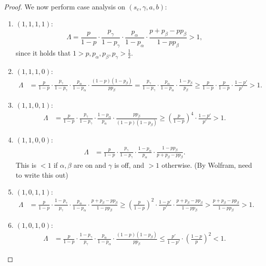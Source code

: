 \begin{proof}
    We now perform case analysis on $ \left( s_c, \gamma, a, b \right) $:
    \begin{enumerate}[ ]
        \item $ \left( 1,1,1,1 \right) $: \[
            \Lambda = \frac{p}{1-p} \cdot \frac{p_\gamma}{1-p_\gamma} \cdot \frac{p_\alpha}{1-p_\alpha} \cdot \frac{p+p_\beta - pp_\beta}{1-pp_\beta} > 1,
        \]
        since it holds that $ 1>p,p_\alpha, p_\beta, p_\gamma> \frac 12  $.
        \item $ \left( 1,1,1,0 \right) $: \begin{align*}
                \Lambda &= \frac{p}{1-p} \cdot \frac{p_\gamma}{1-p_\gamma} \cdot \frac{p_\alpha}{1-p_\alpha} \cdot \frac{\left( 1-p \right)\left( 1-p_\beta \right)}{pp_\beta} = \frac{p_\gamma}{1-p_\gamma} \cdot \frac{p_\alpha}{1-p_\alpha} \cdot \frac{1-p_\beta}{p_\beta} \geq \frac{p}{1-p} \cdot \frac{p}{1-p}  \cdot \frac{1-p'}{p'} > 1.
        \end{align*}
        \item $ \left( 1,1,0,1 \right) $: \begin{align*}
                \Lambda &= \frac{p}{1-p} \cdot \frac{p_\gamma}{1-p_\gamma} \cdot \frac{1-p_\alpha}{p_\alpha} \cdot \frac{pp_\beta}{\left( 1-p \right)\left( 1-p_\beta \right)} \geq \left( \frac{p}{1-p} \right)^4 \cdot \frac{1-p'}{p'} > 1.
        \end{align*}
        \item $ \left( 1,1,0,0 \right) $: \begin{align*}
                \Lambda &= \frac{p}{1-p} \cdot \frac{p_\gamma}{1-p_\gamma} \cdot \frac{1-p_\alpha}{p_\alpha} \cdot \frac{1-pp_\beta}{p+p_\beta - pp_\beta}.
        \end{align*}
        This is $ <1 $ if $ \alpha, \beta  $ are on and $ \gamma $ is off, and $ >1 $ otherwise. (By Wolfram, need to write this out)
        \item $ \left( 1,0,1,1 \right) $: \begin{align*}
                \Lambda &= \frac{p}{1-p} \cdot \frac{1-p_\gamma}{p_\gamma} \cdot \frac{p_\alpha}{1-p_\alpha} \cdot \frac{p+p_\beta - pp_\beta}{1-pp_\beta} \geq \left( \frac{p}{1-p} \right)^2 \cdot \frac{1-p'}{p'} \cdot \frac{p+p_\beta - pp_\beta}{1-pp_\beta} > \frac{p+p_\beta - pp_\beta}{1-pp_\beta} > 1.
        \end{align*}
        \item $ \left( 1,0,1,0 \right) $: \begin{align*}
                \Lambda &= \frac{p}{1-p} \cdot \frac{1-p_\gamma}{p_\gamma} \cdot \frac{p_\alpha}{1-p_\alpha} \cdot \frac{\left( 1-p \right)\left( 1-p_\beta \right)}{pp_\beta} \leq \frac{p'}{1-p'} \cdot \left( \frac{1-p}{p} \right)^2 <1.

\end{align*}
\end{enumerate}
\end{proof}

